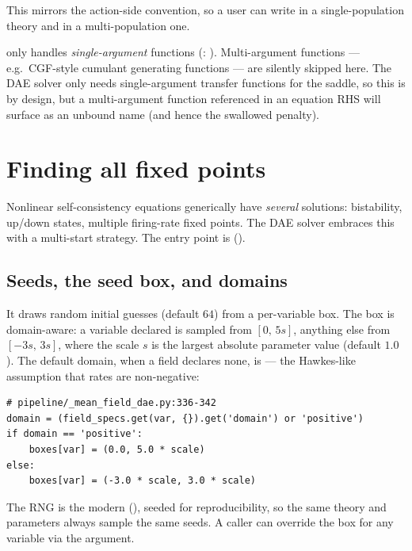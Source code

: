 This mirrors the action-side  convention, so a user
can write  in a single-population theory and  in a
multi-population one.

\begin{gotcha}
 only handles \emph{single-argument} functions
(: ).
Multi-argument functions --- e.g.\ CGF-style cumulant generating functions --- are
silently skipped here. The DAE solver only needs single-argument transfer
functions for the saddle, so this is by design, but a multi-argument function
referenced in an equation RHS will surface as an unbound name (and hence the
swallowed penalty).
\end{gotcha}

\section{Finding all fixed points}

Nonlinear self-consistency equations generically have \emph{several} solutions:
bistability, up/down states, multiple firing-rate fixed points. The DAE solver
embraces this with a multi-start strategy. The entry point is
 ().

\subsection{Seeds, the seed box, and domains}

It draws  random initial guesses (default $64$) from a
per-variable box. The box is domain-aware: a variable declared
 is sampled from $[0,\,5s]$, anything else from
$[-3s,\,3s]$, where the scale $s$ is the largest absolute parameter value
(default $1.0$). The default domain, when a field declares none, is
 --- the Hawkes-like assumption that rates are non-negative:

\begin{lstlisting}
# pipeline/_mean_field_dae.py:336-342
domain = (field_specs.get(var, {}).get('domain') or 'positive')
if domain == 'positive':
    boxes[var] = (0.0, 5.0 * scale)
else:
    boxes[var] = (-3.0 * scale, 3.0 * scale)
\end{lstlisting}

The RNG is the modern 
(), seeded for reproducibility, so the same theory
and parameters always sample the same seeds. A caller can override the box for
any variable via the  argument.

